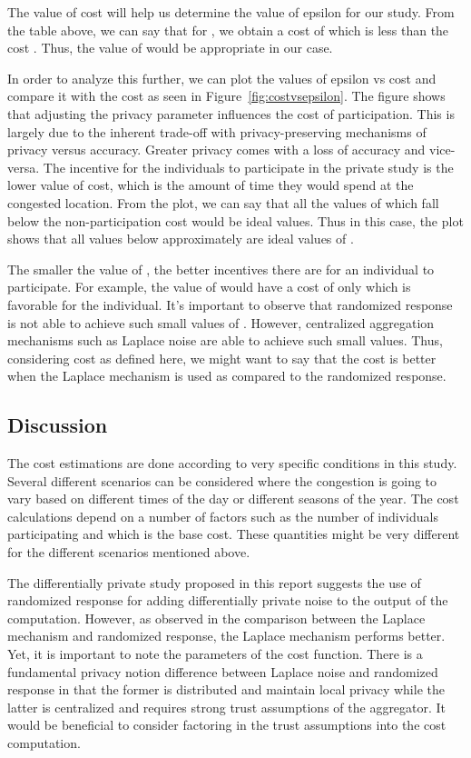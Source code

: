 \documentclass[conference]{IEEEtran}
\begin{document}
The value of cost will help us determine the value of epsilon for our study. From the table above, we can say that for , we obtain a cost of  which is less than the cost . Thus, the value of  would be appropriate in our case.
	
In order to analyze this further, we can plot the values of epsilon vs cost and compare it with the cost as seen in Figure~\ref{fig:costvsepsilon}. The figure shows that adjusting the privacy parameter  influences the cost of participation. This is largely due to the inherent trade-off with privacy-preserving mechanisms of privacy versus accuracy. Greater privacy comes with a loss of accuracy and vice-versa.  The incentive for the individuals to participate in the private study is the lower value of cost, which is the amount of time they would spend at the congested location. From the plot, we can say that all the values of  which fall below the non-participation cost would be ideal values. Thus in this case, the plot shows that all values below approximately  are ideal values of . 

The smaller the value of , the better incentives there are for an individual to participate. For example, the  value of  would have a cost of only  which is favorable for the individual. It's important to observe that randomized response is not able to achieve such small values of . However, centralized aggregation mechanisms such as Laplace noise are able to achieve such small values. Thus, considering cost as defined here, we might want to say that the cost is better when the Laplace mechanism is used as compared to the randomized response. 

\subsection{Discussion}

The cost estimations are done according to very specific conditions in this study. Several different scenarios can be considered  where the congestion is going to vary based on different times of the day or different seasons of the year. The cost calculations depend on a number of factors such as  the number of individuals participating and  which is the base cost. These quantities might be very different for the different scenarios mentioned above. 
	
The differentially private study proposed in this report suggests the use of randomized response for adding differentially private noise to the output of the computation. However, as observed in the comparison between the Laplace mechanism and randomized response, the Laplace mechanism performs better. Yet, it is important to note the parameters of the cost function. There is a fundamental privacy notion difference between Laplace noise and randomized response in that the former is distributed and maintain local privacy while the latter is centralized and requires strong trust assumptions of the aggregator. It would be beneficial to consider factoring in the trust assumptions into the cost computation.
\end{document}
